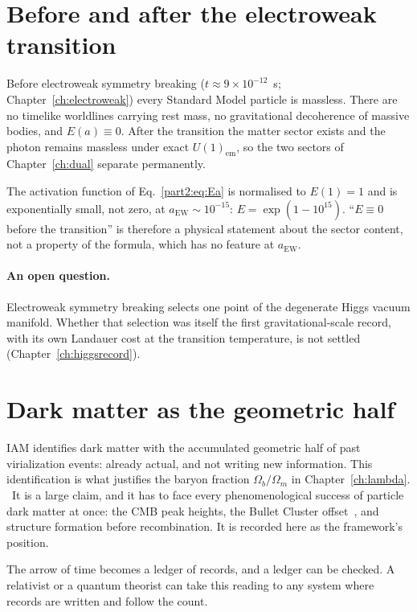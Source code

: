 \section{Before and after the electroweak transition}\label{sec:time_ew}
Before electroweak symmetry breaking ($t\approx9\times10^{-12}$~s; Chapter~\ref{ch:electroweak}) every Standard Model particle is
massless. There are no timelike worldlines carrying rest mass, no gravitational decoherence
of massive bodies, and $E(a)\equiv0$. After the transition the matter sector exists and the
photon remains massless under exact $U(1)_{\mathrm{em}}$, so the two sectors of
Chapter~\ref{ch:dual} separate permanently. \interp

\begin{remark}
The activation function of Eq.~\eqref{part2:eq:Ea} is normalised to $E(1)=1$ and is exponentially
small, not zero, at $a_{\mathrm{EW}}\sim10^{-15}$: $E=\exp(1-10^{15})$. ``$E\equiv0$ before
the transition'' is therefore a physical statement about the sector content, not a property
of the formula, which has no feature at $a_{\mathrm{EW}}$. \calc
\end{remark}

\paragraph{An open question.} Electroweak symmetry breaking selects one point of the degenerate Higgs vacuum manifold. Whether that selection was itself
the first gravitational-scale record, with its own Landauer cost at the transition temperature, is not settled (Chapter~\ref{ch:higgsrecord}). \openprob

\section{Dark matter as the geometric half}

IAM identifies dark matter with the accumulated geometric half of past
virialization events: already actual, and not writing new information. This identification
is what justifies the baryon fraction $\Omega_b/\Omega_m$ in Chapter~\ref{ch:lambda}.
\conjecture\ It is a large claim, and it has to face every phenomenological success of
particle dark matter at once: the CMB peak heights, the Bullet Cluster offset~\cite{Clowe2006}, and
structure formation before recombination. It is recorded here as the framework's position.

The arrow of time becomes a ledger of records, and a ledger can be checked. A relativist or a quantum theorist can take this reading to any system where records are written and follow the count.
